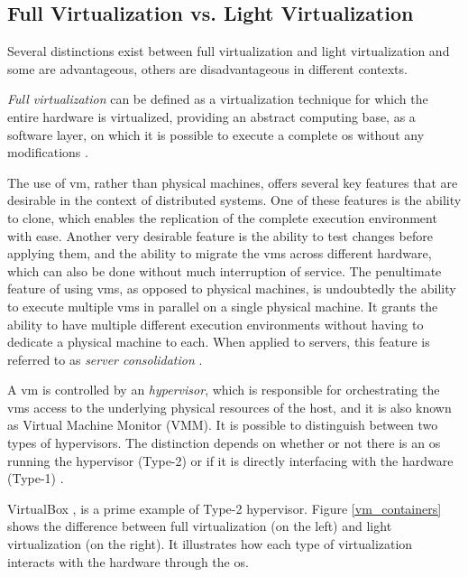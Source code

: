 \documentclass[12pt, titlepage]{uo_temp}
\begin{document}
     \subsection{Full Virtualization vs. Light Virtualization}
     Several distinctions exist between full virtualization and light virtualization and
     some are advantageous, others are disadvantageous in different contexts.

     \emph{Full virtualization} can be defined as a virtualization technique for which the
     entire hardware is virtualized, providing an abstract computing base, as a software
     layer, on which it is possible to execute a complete \gls{os} without any
     modifications \cite{barham2003xen}.

     The use of \gls{vm}, rather than physical machines, offers several key features that
     are desirable in the context of distributed systems. One of these features is the
     ability to clone, which enables the replication of the complete execution environment
     with ease.  Another very desirable feature is the ability to test changes before
     applying them, and the ability to migrate the \gls{vm}s across different hardware,
     which can also be done without much interruption of service. The penultimate feature
     of using \gls{vm}s, as opposed to physical machines, is undoubtedly the ability to
     execute multiple \gls{vm}s in parallel on a single physical machine. It grants the
     ability to have multiple different execution environments without having to dedicate
     a physical machine to each. When applied to servers, this feature is referred to as
     \emph{server consolidation} \cite{tavangarian2012virtual}.

     A \gls{vm} is controlled by an \emph{hypervisor}, which is responsible for
     orchestrating the \gls{vm}s access to the underlying physical resources of the host,
     and it is also known as Virtual Machine Monitor (VMM). It is possible to distinguish
     between two types of hypervisors. The distinction depends on whether or not there is
     an \gls{os} running the hypervisor (Type-2) or if it is directly interfacing with the
     hardware (Type-1) \cite{popek1974formal}.

     VirtualBox \cite{watson2008virtualbox}, is a prime example of Type-2 hypervisor.
     Figure \ref{vm_containers} shows the difference between full virtualization (on the
     left) and light virtualization (on the right). It illustrates how each type of
     virtualization interacts with the hardware through the \gls{os}.
\end{document}
